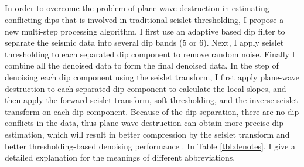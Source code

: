 \subsection{}
In order to overcome the problem of plane-wave destruction in estimating conflicting dips that is involved in traditional seislet thresholding, I propose a new  multi-step processing algorithm.  I first use an adaptive  based dip filter to separate the seismic data into several dip bands (5 or 6). Next, I apply seislet thresholding to each separated dip component  to remove random noise. Finally I combine all the denoised data to form the final denoised data.  In the step of denoising each dip component using the seislet transform, I first apply plane-wave destruction to each separated dip component to calculate the local slopes, and then apply the forward seislet transform, soft thresholding, and the inverse seislet transform on each dip component. Because of the dip separation, there are no dip conflicts in the data, thus plane-wave destruction can obtain more precise dip estimation, which will result in better compression by the seislet transform and better thresholding-based denoising performance . %
  In Table \ref{tbl:denotes}, I give a detailed explanation for the meanings of different abbreviations. 

